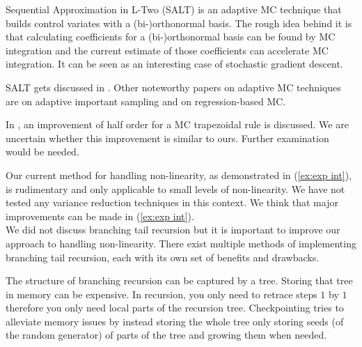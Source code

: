 \documentclass[a4paper,12pt]{article}
\begin{document}
\begin{technique}[SALT]
    Sequential Approximation in L-Two (SALT) is an adaptive MC technique
    that builds control variates with a (bi-)orthonormal basis. The
    rough idea behind it is that calculating coefficients for
    a (bi-)orthonormal basis can be found by MC integration and
    the current estimate of those coefficients can accelerate MC integration.
    It can be seen as an interesting case of stochastic gradient descent.
\end{technique}


\begin{related}[SALT]
    SALT gets discussed in \cite{gobet_new_2014}. Other noteworthy papers on
    adaptive MC techniques are \cite{he_adaptive_2021} on adaptive important sampling
    and \cite{salaun_regression-based_2022} on regression-based MC.
\end{related}


\begin{related}
    In \cite{wu_randomised_2020}, an improvement of half
    order for a MC trapezoidal rule is discussed. We are
    uncertain whether this improvement is similar to ours.
    Further examination would be needed.
\end{related}

Our current method for handling non-linearity, as demonstrated
in (\ref{ex:exp int}), is rudimentary and only applicable to small
levels of non-linearity. We have not tested any
variance reduction techniques in this context. We think that
major improvements can be made in (\ref{ex:exp int}). \\


We did not discuss branching tail recursion but
it is important to improve our approach to handling non-linearity.
There exist multiple methods of implementing branching tail recursion,
each with its own set of benefits and drawbacks.

\begin{technique}[checkpointing]
    The structure of branching recursion can be captured by a tree. Storing that tree
    in memory can be expensive. In recursion, you only need to retrace steps
    $1$ by $1$ therefore you only need local parts of the recursion tree.
    Checkpointing tries to alleviate memory issues by instead storing the whole
    tree only storing seeds (of the random generator) of parts of the
    tree and growing them when needed.
\end{technique}
\end{document}
